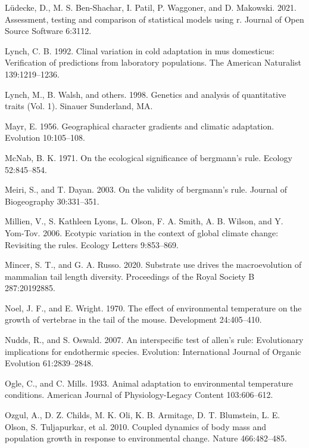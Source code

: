 \documentclass[]{article}
\begin{document}
\leavevmode\hypertarget{ref-Luxfcdecke2021}{}%
Lüdecke, D., M. S. Ben-Shachar, I. Patil, P. Waggoner, and D. Makowski.
2021. Assessment, testing and comparison of statistical models using r.
Journal of Open Source Software 6:3112.

\leavevmode\hypertarget{ref-Lynch1992}{}%
Lynch, C. B. 1992. Clinal variation in cold adaptation in mus
domesticus: Verification of predictions from laboratory populations. The
American Naturalist 139:1219--1236.

\leavevmode\hypertarget{ref-Lynch1998}{}%
Lynch, M., B. Walsh, and others. 1998. Genetics and analysis of
quantitative traits (Vol. 1). Sinauer Sunderland, MA.

\leavevmode\hypertarget{ref-Mayr1956}{}%
Mayr, E. 1956. Geographical character gradients and climatic adaptation.
Evolution 10:105--108.

\leavevmode\hypertarget{ref-McNab1971}{}%
McNab, B. K. 1971. On the ecological significance of bergmann's rule.
Ecology 52:845--854.

\leavevmode\hypertarget{ref-Meiri2003}{}%
Meiri, S., and T. Dayan. 2003. On the validity of bergmann's rule.
Journal of Biogeography 30:331--351.

\leavevmode\hypertarget{ref-Millien2006}{}%
Millien, V., S. Kathleen Lyons, L. Olson, F. A. Smith, A. B. Wilson, and
Y. Yom-Tov. 2006. Ecotypic variation in the context of global climate
change: Revisiting the rules. Ecology Letters 9:853--869.

\leavevmode\hypertarget{ref-Mincer2020}{}%
Mincer, S. T., and G. A. Russo. 2020. Substrate use drives the
macroevolution of mammalian tail length diversity. Proceedings of the
Royal Society B 287:20192885.

\leavevmode\hypertarget{ref-Noel1970}{}%
Noel, J. F., and E. Wright. 1970. The effect of environmental
temperature on the growth of vertebrae in the tail of the mouse.
Development 24:405--410.

\leavevmode\hypertarget{ref-Nudds2007}{}%
Nudds, R., and S. Oswald. 2007. An interspecific test of allen's rule:
Evolutionary implications for endothermic species. Evolution:
International Journal of Organic Evolution 61:2839--2848.

\leavevmode\hypertarget{ref-Ogle1933}{}%
Ogle, C., and C. Mills. 1933. Animal adaptation to environmental
temperature conditions. American Journal of Physiology-Legacy Content
103:606--612.

\leavevmode\hypertarget{ref-Ozgul2010}{}%
Ozgul, A., D. Z. Childs, M. K. Oli, K. B. Armitage, D. T. Blumstein, L.
E. Olson, S. Tuljapurkar, et al. 2010. Coupled dynamics of body mass and
population growth in response to environmental change. Nature
466:482--485.
\end{document}
